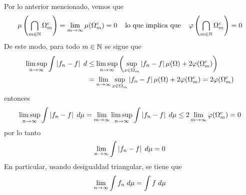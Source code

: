 \documentclass{article}
\begin{document}
Por lo anterior mencionado, vemos que
\begin{equation*}
    \mu\left(\bigcap_{m\in\mathbb{N}}\Omega_{m}^{c}\right)=\lim\limits_{m\to\infty}\mu(\Omega_{m}^{c})=0
    \hspace{4mm}\text{lo que implica que}\hspace{4mm}\varphi\left(\bigcap_{m\in\mathbb{N}}\Omega_{m}^{c}
    \right)=0
\end{equation*}
De este modo, para todo $m\in\mathbb{N}$ se sigue que
\begin{align*}
    \limsup\limits_{n\to\infty}\int\left|f_{n}-f \right|\hspace{1mm}d &\leq
    \limsup\limits_{n\to\infty}\left(\sup_{x\in\Omega_{m}}\left|f_{n}-f \right|\mu(\Omega)
    +2\varphi(\Omega_{m}^{c})\right) \\
    &=\lim\limits_{n\to\infty}\sup_{x\in\Omega_{m}}\left|f_{n}-f \right|\mu(\Omega)
    +2\varphi(\Omega_{m}^{c})=2\varphi(\Omega_{m}^{c})
\end{align*}
entonces
\begin{equation*}
    \limsup\limits_{n\to\infty}\int\left|f_{n}-f \right|\hspace{1mm}d\mu
    =\lim\limits_{m\to\infty}\limsup\limits_{n\to\infty}\int\left|f_{n}-f \right|\hspace{1mm}d\mu
    \leq2\lim\limits_{m\to\infty}\varphi(\Omega_{m}^{c})=0
\end{equation*}
por lo tanto
\begin{equation*}
    \lim\limits_{n\to\infty}\int\left|f_{n}-f \right|\hspace{1mm}d\mu=0
\end{equation*}
En particular, usando desigualdad triangular, se tiene que
\begin{equation*}
    \lim\limits_{n\to\infty}\int f_{n}\hspace{1mm}d\mu=\int f\hspace{1mm}d\mu
\end{equation*}
\end{document}
